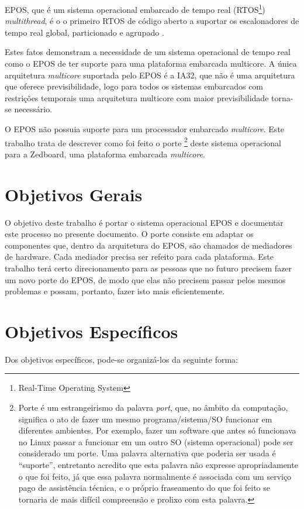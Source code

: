 EPOS, que é um sistema operacional embarcado de tempo real (RTOS\footnote{Real-Time Operating System}) \emph{multithread}, é o o primeiro RTOS de código aberto a suportar os escalonadores de tempo real global, particionado e agrupado \cite{gio}.


Estes fatos demonstram a necessidade de um sistema operacional de tempo real como o EPOS de ter suporte para uma plataforma embarcada multicore. A única arquitetura \emph{multicore} suportada pelo EPOS é a IA32, que não é uma arquitetura que oferece previsibilidade, logo para todos os sistemas embarcados com restrições temporais uma arquitetura multicore com maior previsibilidade torna-se necessário.

O EPOS não possuia suporte para um processador embarcado \emph{multicore}. 
Este trabalho trata de descrever como foi feito o porte
\footnote{Porte é um estrangeirismo da palavra \emph{port}, que, no âmbito da computação, significa o ato de fazer um mesmo programa/sistema/SO funcionar em diferentes ambientes. Por exemplo, fazer um software que antes só funcionava no Linux passar a funcionar em um outro SO (sistema operacional) pode ser considerado um porte. Uma palavra alternativa que poderia ser usada é ``suporte'', entretanto acredito que esta palavra não expresse apropriadamente o que foi feito, já que essa palavra normalmente é associada com um serviço pago de assistência técnica, e o próprio fraseamento do que foi feito se tornaria de mais difícil compreensão e prolixo com esta palavra.}
 deste sistema operacional para a Zedboard, uma plataforma embarcada \emph{multicore}.

\section{Objetivos Gerais}

O objetivo deste trabalho é portar o sistema operacional EPOS e documentar este processo no presente documento. O porte consiste em adaptar os componentes que, dentro da arquitetura do EPOS, são chamados de mediadores de hardware. Cada mediador precisa ser refeito para cada plataforma.
Este trabalho terá certo direcionamento para as pessoas que no futuro precisem fazer um novo porte do EPOS, de modo que elas não precisem passar pelos mesmos problemas e possam, portanto, fazer isto mais eficientemente.

\section{Objetivos Específicos}
Dos objetivos específicos, pode-se organizá-los da seguinte forma:

